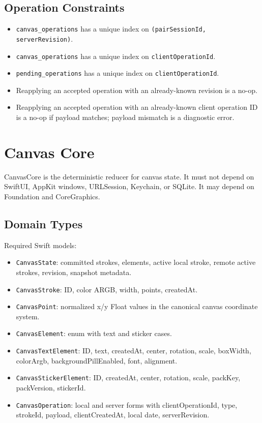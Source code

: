 \documentclass[11pt]{article}
\begin{document}
\subsection{Operation Constraints}

\begin{itemize}
  \item \texttt{canvas\_operations} has a unique index on \texttt{(pairSessionId, serverRevision)}.
  \item \texttt{canvas\_operations} has a unique index on \texttt{clientOperationId}.
  \item \texttt{pending\_operations} has a unique index on \texttt{clientOperationId}.
  \item Reapplying an accepted operation with an already-known revision is a no-op.
  \item Reapplying an accepted operation with an already-known client operation ID is a no-op if payload matches; payload mismatch is a diagnostic error.
\end{itemize}

\section{Canvas Core}

CanvasCore is the deterministic reducer for canvas state. It must not depend on SwiftUI, AppKit windows, URLSession, Keychain, or SQLite. It may depend on Foundation and CoreGraphics.

\subsection{Domain Types}

Required Swift models:
\begin{itemize}
  \item \texttt{CanvasState}: committed strokes, elements, active local stroke, remote active strokes, revision, snapshot metadata.
  \item \texttt{CanvasStroke}: ID, color ARGB, width, points, createdAt.
  \item \texttt{CanvasPoint}: normalized x/y Float values in the canonical canvas coordinate system.
  \item \texttt{CanvasElement}: enum with text and sticker cases.
  \item \texttt{CanvasTextElement}: ID, text, createdAt, center, rotation, scale, boxWidth, colorArgb, backgroundPillEnabled, font, alignment.
  \item \texttt{CanvasStickerElement}: ID, createdAt, center, rotation, scale, packKey, packVersion, stickerId.
  \item \texttt{CanvasOperation}: local and server forms with clientOperationId, type, strokeId, payload, clientCreatedAt, local date, serverRevision.
\end{itemize}
\end{document}
